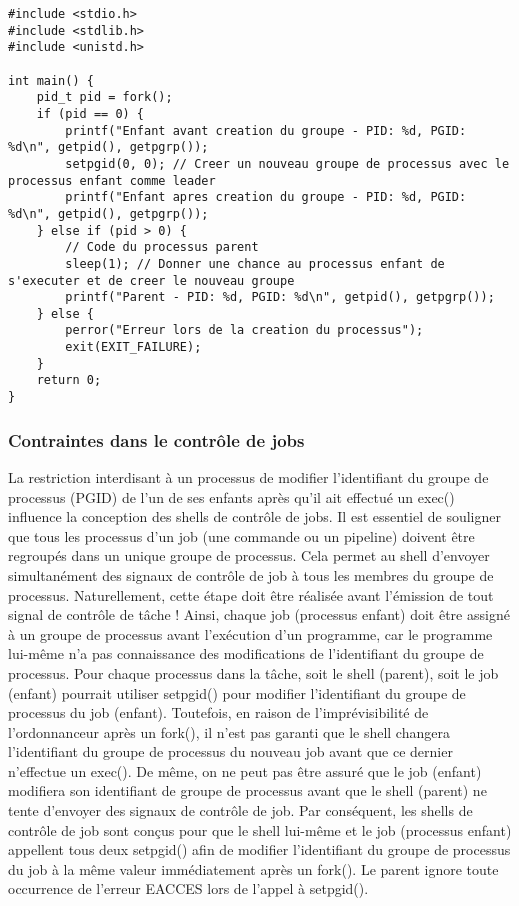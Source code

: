 \begin{lstlisting}[caption={creationGroupe.c}, label={creationGroupe.c}]
#include <stdio.h>
#include <stdlib.h>
#include <unistd.h>

int main() {
    pid_t pid = fork();
    if (pid == 0) {
        printf("Enfant avant creation du groupe - PID: %d, PGID: %d\n", getpid(), getpgrp());
        setpgid(0, 0); // Creer un nouveau groupe de processus avec le processus enfant comme leader
        printf("Enfant apres creation du groupe - PID: %d, PGID: %d\n", getpid(), getpgrp());
    } else if (pid > 0) {
        // Code du processus parent
        sleep(1); // Donner une chance au processus enfant de s'executer et de creer le nouveau groupe
        printf("Parent - PID: %d, PGID: %d\n", getpid(), getpgrp());
    } else {
        perror("Erreur lors de la creation du processus");
        exit(EXIT_FAILURE);
    }
    return 0;
}
\end{lstlisting}


\subsubsection{Contraintes dans le contrôle de jobs}

La restriction interdisant à un processus de modifier l'identifiant du groupe de processus (PGID) de l'un de ses enfants après qu'il ait effectué un exec() influence la conception des shells de contrôle de jobs.
\newline
Il est essentiel de souligner que tous les processus d'un job (une commande ou un pipeline) doivent être regroupés dans un unique groupe de processus. Cela permet au shell d'envoyer simultanément des signaux de contrôle de job à tous les membres du groupe de processus. Naturellement, cette étape doit être réalisée avant l'émission de tout signal de contrôle de tâche !
\newline
Ainsi, chaque job (processus enfant) doit être assigné à un groupe de processus avant l'exécution d'un programme, car le programme lui-même n'a pas connaissance des modifications de l'identifiant du groupe de processus.
\newline
Pour chaque processus dans la tâche, soit le shell (parent), soit le job (enfant) pourrait utiliser setpgid() pour modifier l'identifiant du groupe de processus du job (enfant). Toutefois, en raison de l'imprévisibilité de l'ordonnanceur après un fork(), il n'est pas garanti que le shell changera l'identifiant du groupe de processus du nouveau job avant que ce dernier n'effectue un exec(). De même, on ne peut pas être assuré que le job (enfant) modifiera son identifiant de groupe de processus avant que le shell (parent) ne tente d'envoyer des signaux de contrôle de job. Par conséquent, les shells de contrôle de job sont conçus pour que le shell lui-même et le job (processus enfant) appellent tous deux setpgid() afin de modifier l'identifiant du groupe de processus du job à la même valeur immédiatement après un fork(). Le parent ignore toute occurrence de l'erreur EACCES lors de l'appel à setpgid().
\newline

